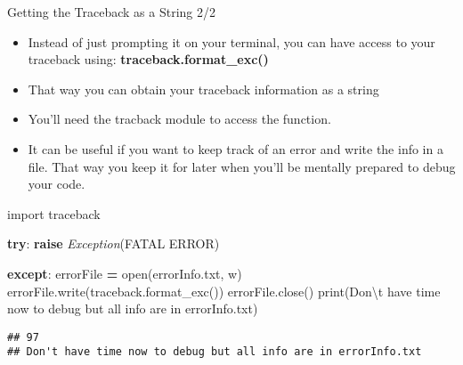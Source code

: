 \documentclass[
  8pt,
  ignorenonframetext,
]{beamer}
\newenvironment{Shaded}{\begin{snugshade}}{\end{snugshade}}
\newcommand{\BuiltInTok}[1]{#1}
\newcommand{\CharTok}[1]{\textcolor[rgb]{0.31,0.60,0.02}{#1}}
\newcommand{\ControlFlowTok}[1]{\textcolor[rgb]{0.13,0.29,0.53}{\textbf{#1}}}
\newcommand{\ImportTok}[1]{#1}
\newcommand{\NormalTok}[1]{#1}
\newcommand{\OperatorTok}[1]{\textcolor[rgb]{0.81,0.36,0.00}{\textbf{#1}}}
\newcommand{\PreprocessorTok}[1]{\textcolor[rgb]{0.56,0.35,0.01}{\textit{#1}}}
\newcommand{\StringTok}[1]{\textcolor[rgb]{0.31,0.60,0.02}{#1}}
\begin{document}
\begin{frame}[fragile]{Getting the Traceback as a String 2/2}
\protect\hypertarget{getting-the-traceback-as-a-string-22}{}
\begin{itemize}
\item
  Instead of just prompting it on your terminal, you can have access to
  your traceback using: \textbf{traceback.format\_exc()}
\item
  That way you can obtain your traceback information as a string
\item
  You'll need the tracback module to access the function.
\item
  It can be useful if you want to keep track of an error and write the
  info in a file. That way you keep it for later when you'll be mentally
  prepared to debug your code.
\end{itemize}

\begin{Shaded}
\begin{Highlighting}[]
\ImportTok{import}\NormalTok{ traceback}

\ControlFlowTok{try}\NormalTok{:}
  \ControlFlowTok{raise} \PreprocessorTok{Exception}\NormalTok{(}\StringTok{\textquotesingle{}FATAL ERROR\textquotesingle{}}\NormalTok{)}

\ControlFlowTok{except}\NormalTok{:}
\NormalTok{  errorFile }\OperatorTok{=} \BuiltInTok{open}\NormalTok{(}\StringTok{\textquotesingle{}errorInfo.txt\textquotesingle{}}\NormalTok{, }\StringTok{\textquotesingle{}w\textquotesingle{}}\NormalTok{)}
\NormalTok{  errorFile.write(traceback.format\_exc())}
\NormalTok{  errorFile.close()}
  \BuiltInTok{print}\NormalTok{(}\StringTok{\textquotesingle{}Don}\CharTok{\textbackslash{}\textquotesingle{}}\StringTok{t have time now to debug but all info are in errorInfo.txt\textquotesingle{}}\NormalTok{)}
    
\end{Highlighting}
\end{Shaded}

\begin{verbatim}
## 97
## Don't have time now to debug but all info are in errorInfo.txt
\end{verbatim}
\end{frame}
\end{document}

